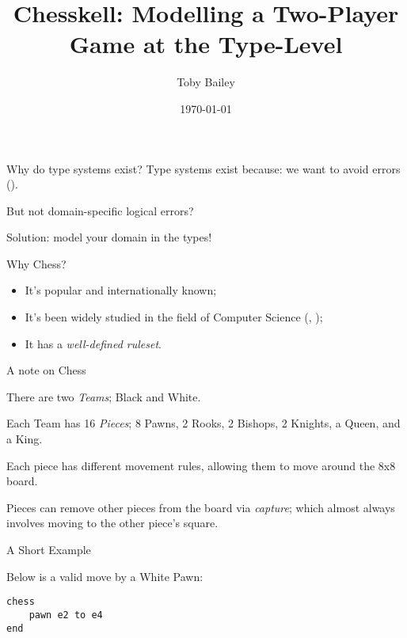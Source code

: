 \documentclass{beamer}
\title{Chesskell: Modelling a Two-Player Game at the Type-Level}
\author{Toby Bailey}
\institute{Department of Computer Science}
\date{\today}
\begin{document}
\frame{\titlepage}

\begin{frame}{Why do type systems exist?}
Type systems exist because: \pause we want to avoid errors (\cite{cardellitypes}).

\pause But not domain-specific logical errors?

\pause Solution: model your domain in the types!
\end{frame}

\begin{frame}{Why Chess?}

\begin{itemize}
    \item<1-3> It's popular and internationally known;
    \item<2-3> It's been widely studied in the field of Computer Science (\cite{chesseducation}, \cite{chessml});
    \item<3-4> It has a \emph{well-defined ruleset}.
\end{itemize}
    
\end{frame}

\begin{frame}{A note on Chess}

There are two \emph{Teams}; Black and White.

\pause

Each Team has 16 \emph{Pieces}; 8 Pawns, 2 Rooks, 2 Bishops, 2 Knights, a Queen, and a King.

\pause

Each piece has different movement rules, allowing them to move around the 8x8 board.

\pause

Pieces can remove other pieces from the board via \emph{capture}; which almost always involves moving to the other piece's square.

\end{frame}

\begin{frame}[fragile]{A Short Example}

Below is a valid move by a White Pawn:

\begin{figure}[h]
    \centering
    \newgame
    \scalebox{0.55}{\showboard}
    \quad
    \scalebox{0.55}{\showboard}
    \label{validpawnmove}
\end{figure}

\pause

\begin{lstlisting}
chess
    pawn e2 to e4
end
\end{lstlisting}

\end{frame}
\end{document}
